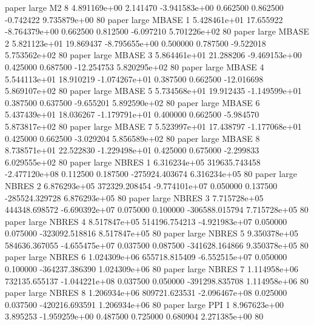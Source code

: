               paper      large       M2                 8 4.891169e+00      2.141470 -3.941583e+00 0.662500 0.862500      -0.742422 9.735879e+00 80
              paper      large    MBASE                 1 5.428461e+01     17.655922 -8.764379e+00 0.662500 0.812500      -6.097210 5.701226e+02 80
              paper      large    MBASE                 2 5.821123e+01     19.869437 -8.795655e+00 0.500000 0.787500      -9.522018 5.753562e+02 80
              paper      large    MBASE                 3 5.864461e+01     21.288206 -9.469153e+00 0.425000 0.687500     -12.254753 5.820295e+02 80
              paper      large    MBASE                 4 5.544113e+01     18.910219 -1.074267e+01 0.387500 0.662500     -12.016698 5.869107e+02 80
              paper      large    MBASE                 5 5.734568e+01     19.912435 -1.149599e+01 0.387500 0.637500      -9.655201 5.892590e+02 80
              paper      large    MBASE                 6 5.437439e+01     18.036267 -1.179791e+01 0.400000 0.662500      -5.984570 5.873817e+02 80
              paper      large    MBASE                 7 5.523997e+01     17.438797 -1.177068e+01 0.425000 0.662500      -3.029204 5.856589e+02 80
              paper      large    MBASE                 8 8.738571e+01     22.522830 -1.229498e+01 0.425000 0.675000      -2.299833 6.029555e+02 80
              paper      large    NBRES                 1 6.316234e+05 319635.743458 -2.477120e+08 0.112500 0.187500 -275924.403674 6.316234e+05 80
              paper      large    NBRES                 2 6.876293e+05 372329.208454 -9.774101e+07 0.050000 0.137500 -285524.329728 6.876293e+05 80
              paper      large    NBRES                 3 7.715728e+05 444348.698572 -6.690392e+07 0.075000 0.100000 -306588.015794 7.715728e+05 80
              paper      large    NBRES                 4 8.517847e+05 514196.754213 -4.921983e+07 0.050000 0.075000 -323092.518816 8.517847e+05 80
              paper      large    NBRES                 5 9.350378e+05 584636.367055 -4.655475e+07 0.037500 0.087500 -341628.164866 9.350378e+05 80
              paper      large    NBRES                 6 1.024309e+06 655718.815409 -6.552515e+07 0.050000 0.100000 -364237.386390 1.024309e+06 80
              paper      large    NBRES                 7 1.114958e+06 732135.655137 -1.044221e+08 0.037500 0.050000 -391298.835708 1.114958e+06 80
              paper      large    NBRES                 8 1.206934e+06 809721.623531 -2.096467e+08 0.025000 0.037500 -420216.693591 1.206934e+06 80
              paper      large      PPI                 1 8.967623e+00      3.895253 -1.959259e+00 0.487500 0.725000       0.680904 2.271385e+00 80
